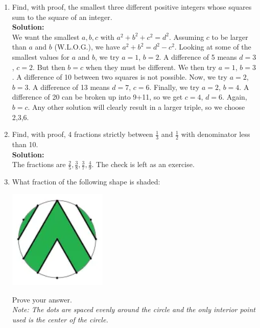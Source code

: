 \documentclass{article}
\begin{document}
\begin{enumerate}[1.]
\item Find, with proof, the smallest three different positive integers whose squares sum to the square of an integer.\\ %

\textbf{Solution:}\\
We want the smallest $a,b,c$ with $a^2+b^2+c^2=d^2$. Assuming $c$ to be larger than $a$ and $b$ (W.L.O.G.), we have $a^2+b^2=d^2-c^2$. Looking at some of the smallest values for $a$ and $b$, we try $a=1$, $b=2$. A difference of 5 means $d=3$, $c=2$. But then $b=c$ when they must be different. We then try $a=1$, $b=3$. A difference of 10 between two squares is not possible. Now, we try $a=2$, $b=3$. A difference of 13 means $d=7$, $c=6$. Finally, we try $a=2$, $b=4$. A difference of 20 can be broken up into 9+11, so we get $c=4$, $d=6$. Again, $b=c$. Any other solution will clearly result in a larger triple, so we choose 2,3,6.\\



\item Find, with proof, 4 fractions strictly between $\frac{1}{3}$ and $\frac{1}{2}$ with denominator less than 10.\\ %

\textbf{Solution:}\\
The fractions are $\frac{2}{5},\frac{3}{8},\frac{3}{7},\frac{4}{9}$. The check is left as an exercise.\\

\newpage

\item What fraction of the following shape is shaded:
\begin{center}
	\includegraphics[scale=1.0]{beginner_test_1_img_1.png}	
\end{center}
Prove your answer.\\
\textit{Note: The dots are spaced evenly around the circle and the only interior point used is the center of the circle.}\\


\end{enumerate}
\end{document}
